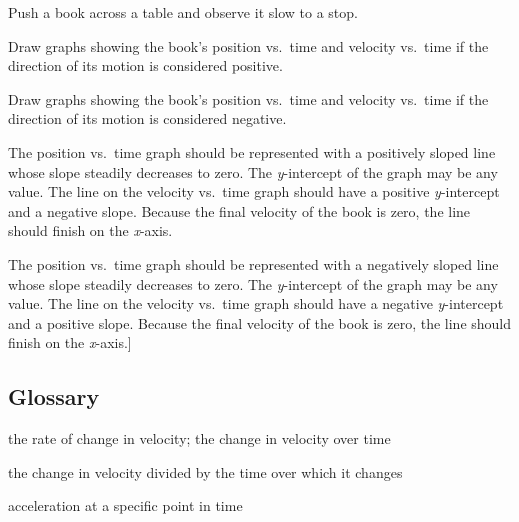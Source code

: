 \documentclass[
]{book}
\providecommand{\tightlist}{%
  \setlength{\itemsep}{0pt}\setlength{\parskip}{0pt}}
\newenvironment{ap-test-prep}{}{}
\begin{document}
\begin{ap-test-prep}
\hypertarget{fs-id1860126}{}
\leavevmode\hypertarget{fs-id2388387}{}%
Push a book across a table and observe it slow to a stop.

Draw graphs showing the book's position vs.~time and velocity vs.~time
if the direction of its motion is considered positive.

Draw graphs showing the book's position vs.~time and velocity vs.~time
if the direction of its motion is considered negative.

\leavevmode\hypertarget{fs-id2548115}{}%
The position vs.~time graph should be represented with a positively
sloped line whose slope steadily decreases to zero. The \emph{y}-intercept of
the graph may be any value. The line on the velocity vs.~time graph
should have a positive \emph{y}-intercept and a negative slope. Because the
final velocity of the book is zero, the line should finish on the
\emph{x}-axis.

The position vs.~time graph should be represented with a negatively
sloped line whose slope steadily decreases to zero. The \emph{y}-intercept of
the graph may be any value. The line on the velocity vs.~time graph
should have a negative \emph{y}-intercept and a positive slope. Because the
final velocity of the book is zero, the line should finish on the
\emph{x}-axis.{]}

\end{ap-test-prep}

\hypertarget{glossary-3}{%
\subsection{Glossary}\label{glossary-3}}

\begin{description}
\tightlist
\item[acceleration]
the rate of change in velocity; the change in velocity over time
\end{description}

\begin{description}
\tightlist
\item[average acceleration]
the change in velocity divided by the time over which it changes
\end{description}

\begin{description}
\tightlist
\item[instantaneous acceleration]
acceleration at a specific point in time
\end{description}
\end{document}
